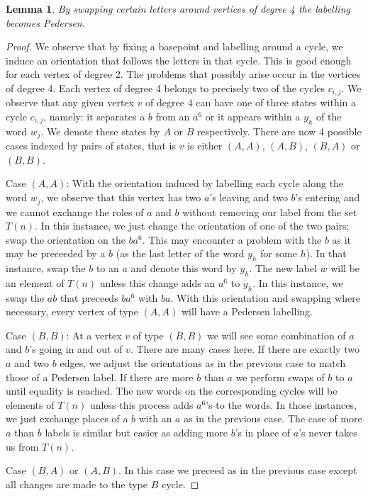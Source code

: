 \documentclass[11pt,a4paper]{amsart}
\theoremstyle{plain}
\newtheorem{lemma}[theorem]{Lemma}%
\theoremstyle{definition}%
\theoremstyle{remark}%
\begin{document}
\begin{lemma}
By swapping certain letters around vertices of degree 4 the labelling becomes Pedersen.
\end{lemma}
\begin{proof}
We observe that by fixing a basepoint and labelling around a cycle, we induce an orientation that follows the letters in that cycle. This is good enough for each vertex of degree 2. The problems that possibly arise occur in the vertices of degree 4. Each vertex of degree 4 belongs to precisely two of the cycles $c_{i,j}$. We observe that any given vertex $v$ of degree 4 can have one of three states within a cycle $c_{i,j}$, namely: it separates a $b$ from an $a^{6}$ or it appears within a $y_{h}$ of the word $w_{j}$. We denote these states by $A$ or $B$ respectively. There are now 4 possible cases indexed by pairs of states, that is $v$ is either $(A,A)$, $(A,B)$, $(B,A)$ or $(B,B)$.

Case $(A,A)$: With the orientation induced by labelling each cycle along the word $w_{j}$, we observe that this vertex has two $a$'s leaving and two $b$'s entering and we cannot exchange the roles of $a$ and $b$ without removing our label from the set $T(n)$. In this instance, we just change the orientation of one of the two pairs; swap the orientation on the $ba^{6}$. This may encounter a problem with the $b$ as it may be preceeded by a $b$ (as the last letter of the word $y_{h}$ for some $h$). In that instance, swap the $b$ to an $a$ and denote this word by $\overline{y}_{h}$. The new label $\overline{w}$ will be an element of $T(n)$ unless this change adds an $a^{6}$ to $\overline{y}_{h}$. In this instance, we swap the $ab$ that preceeds $ba^{6}$ with $ba$. With this orientation and swapping where necessary, every vertex of type $(A,A)$ will have a Pedersen labelling.

Case $(B,B)$: At a vertex $v$ of type $(B,B)$ we will see some combination of $a$ and $b$'s going in and out of $v$. There are many cases here. If there are exactly two $a$ and two $b$ edges, we adjust the orientations as in the previous case to match those of a Pedersen label. If there are more $b$ than $a$ we perform swaps of $b$ to $a$ until equality is reached. The new words on the corresponding cycles will be elements of $T(n)$ unless this process adds $a^{6}$'s to the words. In those instances, we just exchange places of a $b$ with an $a$ as in the previous case. The case of more $a$ than $b$ labels is similar but easier as adding more $b$'s in place of $a$'s never takes us from $T(n)$. 

Case $(B,A)$ or $(A,B)$. In this case we preceed as in the previous case except all changes are made to the type $B$ cycle.
\end{proof}
\end{document}
